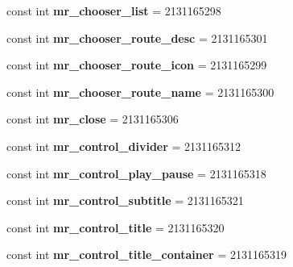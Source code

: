 \begin{DoxyCompactItemize}
\mbox{\label{classXaria_1_1Resource_1_1Id_a0c7a089702adf41a2bb573210bb7db98}} 
const int {\bfseries mr\+\_\+chooser\+\_\+list} = 2131165298
\item 
\mbox{\label{classXaria_1_1Resource_1_1Id_a5c6f2eb880a849172db229112cfaa4f7}} 
const int {\bfseries mr\+\_\+chooser\+\_\+route\+\_\+desc} = 2131165301
\item 
\mbox{\label{classXaria_1_1Resource_1_1Id_a048836f5f49481b69dd039a2aa128a87}} 
const int {\bfseries mr\+\_\+chooser\+\_\+route\+\_\+icon} = 2131165299
\item 
\mbox{\label{classXaria_1_1Resource_1_1Id_a084ee7e038a8ca68ae78399038b4a0fa}} 
const int {\bfseries mr\+\_\+chooser\+\_\+route\+\_\+name} = 2131165300
\item 
\mbox{\label{classXaria_1_1Resource_1_1Id_a534aae16ae57f533766427f117f14840}} 
const int {\bfseries mr\+\_\+close} = 2131165306
\item 
\mbox{\label{classXaria_1_1Resource_1_1Id_aed0cd81a53a1e4fc9b622d118f4e6599}} 
const int {\bfseries mr\+\_\+control\+\_\+divider} = 2131165312
\item 
\mbox{\label{classXaria_1_1Resource_1_1Id_a07fd086b2c205a51a0a7478bfe5b6087}} 
const int {\bfseries mr\+\_\+control\+\_\+play\+\_\+pause} = 2131165318
\item 
\mbox{\label{classXaria_1_1Resource_1_1Id_a834daca92f8ec387f818d5746e07b679}} 
const int {\bfseries mr\+\_\+control\+\_\+subtitle} = 2131165321
\item 
\mbox{\label{classXaria_1_1Resource_1_1Id_ab3fa9484d5221dd869d464581ec0203a}} 
const int {\bfseries mr\+\_\+control\+\_\+title} = 2131165320
\item 
\mbox{\label{classXaria_1_1Resource_1_1Id_a7290bb3701e11f86c848e8823b5a163f}} 
const int {\bfseries mr\+\_\+control\+\_\+title\+\_\+container} = 2131165319

\end{DoxyCompactItemize}
